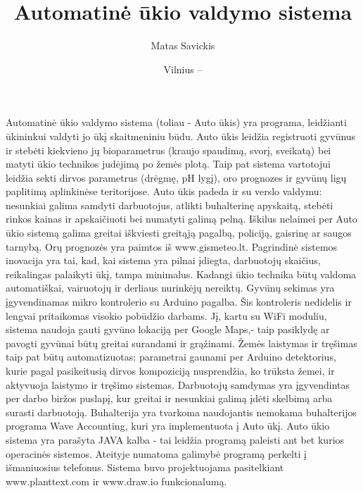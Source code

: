 \documentclass[oneside]{VUMIFPSkursinis}
\title{Automatinė ūkio valdymo sistema}
\author{Matas Savickis}
\date{Vilnius – \the\year}
\begin{document}
\maketitle

\tableofcontents


\centering	
{}
Automatinė ūkio valdymo sistema (toliau - Auto ūkis) yra programa, leidžianti ūkininkui valdyti jo ūkį skaitmeniniu būdu. Auto ūkis leidžia registruoti gyvūnus ir stebėti kiekvieno jų bioparametrus (kraujo spaudimą, svorį, sveikatą) bei matyti ūkio technikos judėjimą po žemės plotą. Taip pat sistema vartotojui leidžia sekti dirvos parametrus (drėgmę, pH lygį), oro prognozes ir gyvūnų ligų paplitimą aplinkinėse teritorijose. Auto ūkis padeda ir su verslo valdymu: nesunkiai galima samdyti darbuotojus, atlikti buhalterinę apyskaitą, stebėti rinkos kainas ir apskaičiuoti bei numatyti galimą pelną. Iškilus nelaimei per Auto ūkio sistemą galima greitai iškviesti greitąją pagalbą, policiją, gaisrinę ar saugos tarnybą. Orų prognozės yra paimtos iš www.gismeteo.lt. Pagrindinė sistemos inovacija yra tai, kad, kai sistema yra pilnai įdiegta, darbuotojų skaičius, reikalingas palaikyti ūkį, tampa minimalus. Kadangi ūkio technika būtų valdoma automatiškai, vairuotojų ir derliaus nurinkėjų nereiktų. Gyvūnų sekimas yra įgyvendinamas mikro kontrolerio su Arduino pagalba. Šis kontroleris nedidelis ir lengvai pritaikomas visokio pobūdžio darbams. Jį, kartu su WiFi moduliu, sistema naudoja gauti gyvūno lokaciją per Google Maps,- taip pasiklydę ar pavogti gyvūnai būtų greitai surandami ir grąžinami. Žemės laistymas ir tręšimas taip pat būtų automatizuotas: parametrai gaunami per Arduino detektorius, kurie pagal pasikeitusią dirvos kompoziciją nusprendžia, ko trūksta žemei, ir aktyvuoja laistymo ir tręšimo sistemas. Darbuotojų samdymas yra įgyvendintas per darbo biržos puslapį, kur greitai ir nesunkiai galimą įdėti skelbimą arba surasti darbuotoją. Buhalterija yra tvarkoma naudojantis nemokama buhalterijos programa Wave Accounting, kuri yra implementuota į Auto ūkį.  Auto ūkio sistema yra parašyta JAVA kalba - tai leidžia programą paleisti ant bet kurios operacinės sistemos. Ateityje numatoma galimybė programą perkelti į išmaniuosius telefonus. Sistema buvo projektuojama pasitelkiant www.planttext.com ir www.draw.io funkcionalumą.
\end{document}
